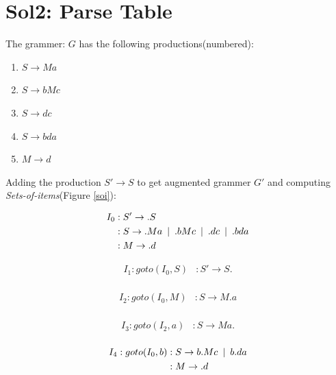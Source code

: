 \documentclass{article}
\newcommand\tab[1][5pt]{\hspace*{#1}}
\begin{document}
\section*{Sol2: Parse Table}
The grammer: $G$ has the following productions(numbered):
\begin{enumerate}
\item $S \rightarrow Ma$
\item $S \rightarrow bMc$
\item $S \rightarrow dc$
\item $S \rightarrow bda$
\item $M \rightarrow d$
\end{enumerate}
Adding the production $S' \rightarrow S$ to get augmented grammer $G'$ and computing \emph{Sets-of-items}(Figure \ref{soi}):
\begin{figure}[h!]
\begin{multicols}{2}
\begin{equation*}
\begin{aligned}
I_0 &: S' \rightarrow .S  \\
&: S \rightarrow .Ma \hspace{5pt} | \tab .bMc \tab | \tab .dc \tab | \tab .bda \\
&: M \rightarrow .d
\end{aligned}
\end{equation*}

\begin{equation*}
\begin{aligned}
I_1 : goto(I_0,S) &: S' \rightarrow S.  \\
\end{aligned}
\end{equation*}


\begin{equation*}
\begin{aligned}
I_2 : goto(I_0,M) &: S \rightarrow M.a  \\
\end{aligned}
\end{equation*}


\begin{equation*}
\begin{aligned}
I_3 : goto(I_2,a) &: S \rightarrow Ma.  \\
\end{aligned}
\end{equation*}


\begin{equation*}
\begin{aligned}
I_4 : goto(I_0,b) &: S \rightarrow b.Mc \tab | \tab b.da  \\
&: M \rightarrow .d \\
\end{aligned}
\end{equation*}



\end{multicols}
\end{figure}
\end{document}

